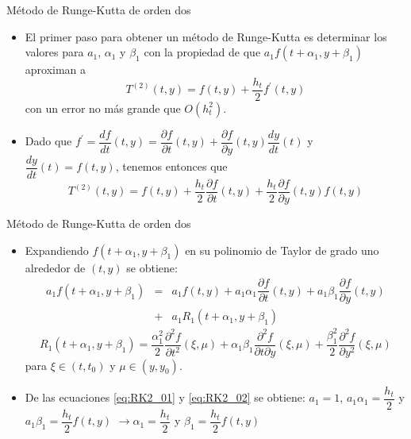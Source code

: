 \documentclass{beamer}
\begin{document}
\begin{frame}{Método de Runge-Kutta de orden dos}

{\small 
\begin{itemize}
	\item El primer paso para obtener un método de Runge-Kutta es determinar los valores para $a_1$, $\alpha_1$ y $\beta_1$ con la propiedad de que $a_1 f(t+\alpha_1, y+\beta_1)$ aproximan a
	\begin{displaymath}
	T^{(2)}(t, y) = f(t,y) + \dfrac{h_t}{2} f^\prime(t,y)
	\end{displaymath}
	con un error no más grande que $O(h_t^2)$.
	
	\item Dado que $f^\prime = \dfrac{df}{dt}(t,y) = \dfrac{\partial f}{\partial t}(t,y) + \dfrac{\partial f}{\partial y}(t,y) \dfrac{dy}{dt}(t)$ y $\dfrac{dy}{dt}(t) = f(t,y)$, tenemos entonces que
\begin{equation}\label{eq:RK2_01}
T^{(2)}(t, y) = f(t,y) + \dfrac{h_t}{2} \dfrac{\partial f}{\partial t}(t,y) + \dfrac{h_t}{2} \dfrac{\partial f}{\partial y}(t,y) f(t,y)
\end{equation}
\end{itemize}
}
\end{frame}

\begin{frame}{Método de Runge-Kutta de orden dos}

 {\small 
\begin{itemize}
	\item Expandiendo $f(t+\alpha_1, y+\beta_1)$ en su polinomio de Taylor de grado uno alrededor de $(t,y)$ se obtiene:
	\begin{eqnarray}
	a_1 f(t+\alpha_1, y+\beta_1) & = & a_1f(t,y) + a_1 \alpha_1 \dfrac{\partial f}{\partial t}(t,y) + 
	a_1 \beta_1 \dfrac{\partial f}{\partial y}(t,y) \nonumber\\
	& + & a_1 R_1(t+\alpha_1, y+\beta_1) \label{eq:RK2_02}
	\end{eqnarray}
	\begin{displaymath}
	R_1(t+\alpha_1, y+\beta_1) = \dfrac{\alpha_1^2}{2}\dfrac{\partial^2 f}{\partial t^2} (\xi,\mu) +
	\alpha_1\beta_1\dfrac{\partial^2 f}{\partial t \partial y} (\xi,\mu) +  
	\dfrac{\beta_1^2}{2}\dfrac{\partial^2 f}{\partial y^2} (\xi,\mu) 
	\end{displaymath}
	para $\xi \in (t, t_0)$ y $\mu \in (y,y_0)$.
	\item De las ecuaciones \eqref{eq:RK2_01} y \eqref{eq:RK2_02} se obtiene:
	$\boxed{a_1 = 1}$, $a_1\alpha_1 = \dfrac{h_t}{2}$ y $a_1 \beta_1 = \dfrac{h_t}{2} f(t,y)$ $\longrightarrow \boxed{\alpha_1= \dfrac{h_t}{2}}$ y $\boxed{\beta_1 =  \dfrac{h_t}{2} f(t,y)}$
\end{itemize}
}
\end{frame}
\end{document}

